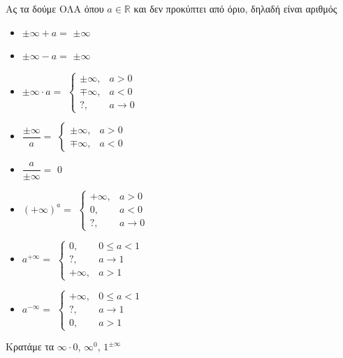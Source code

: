 \documentclass{presentation}
\begin{document}
\begin{frame}{Ας τα δούμε ΟΛΑ}
  όπου $a\in\mathbb{R}$ και δεν προκύπτει από όριο, δηλαδή είναι αριθμός
  \begin{multicols}{2}
    \begin{itemize}
      \item $\pm\infty + a=$ \pause $\pm\infty$ \pause
      \item $\pm\infty - a=$ \pause $\pm\infty$ \pause
      \item $\pm\infty \cdot a=$ \pause $\begin{cases} \pm\infty, & a>0 \\ \mp\infty, & a<0 \\ ?, & a\to 0\end{cases}$ \pause
      \item $\dfrac{\pm\infty}{a}=$ \pause $\begin{cases} \pm\infty, & a>0 \\ \mp\infty, & a<0\end{cases}$ \pause
      \item $\dfrac{a}{\pm\infty}=$ \pause $0$ \pause
      \item $(+\infty)^a=$ \pause $\begin{cases} +\infty, & a>0 \\ 0, & a<0 \\ ?, & a\to 0\end{cases}$ \pause
      \item $a^{+\infty}=$ \pause $\begin{cases} 0, & 0\le a <1 \\ ?, & a\to 1 \\ +\infty, & a>1\end{cases}$ \pause
      \item $a^{-\infty}=$ \pause $\begin{cases} +\infty, & 0\le a <1 \\ ?, & a\to 1 \\ 0, & a>1\end{cases}$
    \end{itemize}
  \end{multicols}
  Κρατάμε τα $\infty\cdot 0$, $\infty^0$, $1^{\pm\infty}$
\end{frame}
\end{document}
